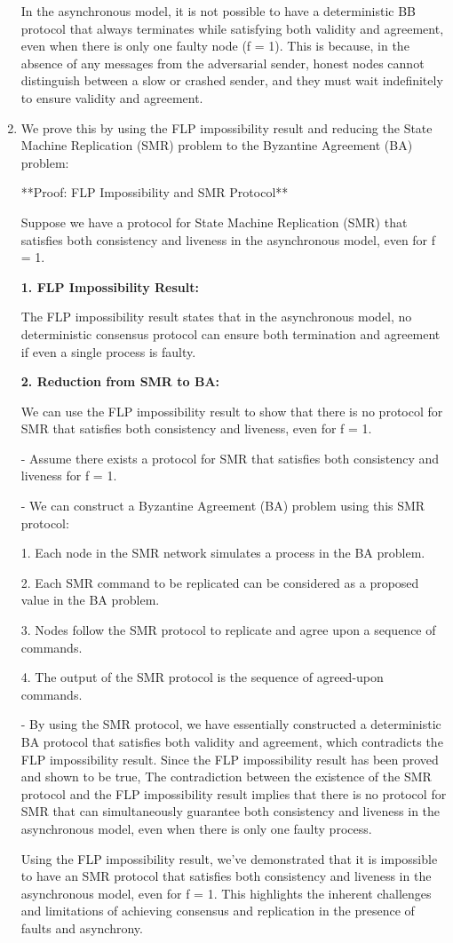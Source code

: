 \documentclass{article}
\begin{document}
\begin{enumerate}
In the asynchronous model, it is not possible to have a deterministic BB protocol that always terminates while satisfying both validity and agreement, even when there is only one faulty node (f = 1). This is because, in the absence of any messages from the adversarial sender, honest nodes cannot distinguish between a slow or crashed sender, and they must wait indefinitely to ensure validity and agreement.
\item %

We prove this by using the FLP impossibility result and reducing the State Machine Replication (SMR) problem to the Byzantine Agreement (BA) problem:

**Proof: FLP Impossibility and SMR Protocol**

Suppose we have a protocol for State Machine Replication (SMR) that satisfies both consistency and liveness in the asynchronous model, even for f = 1.

\textbf{1. FLP Impossibility Result:}
   
   The FLP impossibility result states that in the asynchronous model, no deterministic consensus protocol can ensure both termination and agreement if even a single process is faulty.

\textbf{2. Reduction from SMR to BA:}
   
   We can use the FLP impossibility result to show that there is no protocol for SMR that satisfies both consistency and liveness, even for f = 1.

   - Assume there exists a protocol for SMR that satisfies both consistency and liveness for f = 1.
   
   - We can construct a Byzantine Agreement (BA) problem using this SMR protocol:
   
     1. Each node in the SMR network simulates a process in the BA problem.
     
     2. Each SMR command to be replicated can be considered as a proposed value in the BA problem.
     
     3. Nodes follow the SMR protocol to replicate and agree upon a sequence of commands.
     
     4. The output of the SMR protocol is the sequence of agreed-upon commands.

   - By using the SMR protocol, we have essentially constructed a deterministic BA protocol that satisfies both validity and agreement, which contradicts the FLP impossibility result.
   Since the FLP impossibility result has been proved and shown to be true, The contradiction between the existence of the SMR protocol and the FLP impossibility result implies that there is no protocol for SMR that can simultaneously guarantee both consistency and liveness in the asynchronous model, even when there is only one faulty process.

Using the FLP impossibility result, we've demonstrated that it is impossible to have an SMR protocol that satisfies both consistency and liveness in the asynchronous model, even for f = 1. This highlights the inherent challenges and limitations of achieving consensus and replication in the presence of faults and asynchrony.

\end{enumerate}
\end{document}
